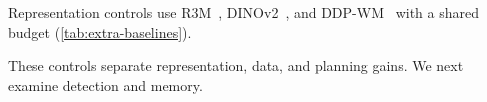 \begin{table}[!t]
\par\smallskip
\noindent \begin{minipage}[t]{\columnwidth}
\vspace{0pt}
Representation controls use R3M~\cite{nair2022r3m}, DINOv2~\cite{oquab2024dinov2}, and DDP-WM~\cite{yin2026ddpwm} with a shared budget (\cref{tab:extra-baselines}).
\end{minipage}\hfill
\begin{minipage}[t]{\columnwidth}
\vspace{0pt}
These controls separate representation, data, and planning gains. We next examine detection and memory.
\end{minipage}\par
\par\smallskip
\noindent \begin{minipage}[t]{\columnwidth}
\vspace{0pt}

\end{minipage}
\end{table}
